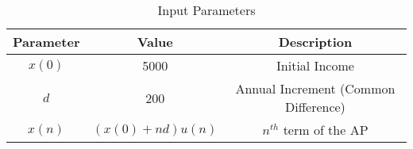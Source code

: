 \begin{table}[h!]
    \centering
    \begin{tabular}{ | c | c | c | }
        \hline
        Parameter & Value & Description \\
        \hline
        $x(0)$ & 5000 & Initial Income \\
        \hline
        $d$ & 200 & Annual Increment (Common Difference) \\
        \hline
        $x(n)$ & $(x(0) + nd)u(n)$ & $n^{th}$ term of the AP \\
        \hline
    \end{tabular}
    \caption{Input Parameters}
    \label{tab:math_10_5_2_19}
\end{table}